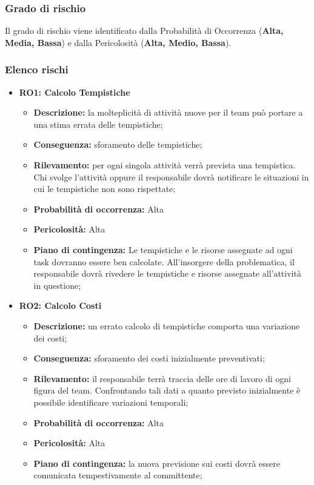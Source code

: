 \subsubsection{Grado di rischio}
Il grado di rischio viene identificato dalla Probabilità di Occorrenza (\textbf{Alta, Media, Bassa}) e dalla Pericolosità (\textbf{Alta, Medio, Bassa}).
\subsubsection{Elenco rischi}

\begin{itemize}
	\item \textbf{RO1: Calcolo Tempistiche}
	\begin{itemize}
		\item \textbf{Descrizione:} la molteplicità di attività nuove per il team può portare a una stima errata delle tempistiche;
		\item \textbf{Conseguenza:} sforamento delle tempistiche;
		\item \textbf{Rilevamento:} per ogni singola attività verrà prevista una tempistica. Chi svolge l'attività oppure il responsabile dovrà notificare le situazioni in cui le tempistiche non sono rispettate;
		\item \textbf{Probabilità di occorrenza:} Alta
		\item \textbf{Pericolosità:} Alta
		\item \textbf{Piano di contingenza:} Le tempistiche e le risorse assegnate ad ogni task dovranno essere ben calcolate. All'insorgere della problematica, il responsabile dovrà rivedere le tempistiche e risorse assegnate all'attività in questione;
	\end{itemize}
	
	\item \textbf{RO2: Calcolo Costi}
	\begin{itemize}
		\item \textbf{Descrizione:} un errato calcolo di tempistiche comporta una variazione dei costi;
		\item \textbf{Conseguenza:} sforamento dei costi inizialmente preventivati;
		\item \textbf{Rilevamento:} il responsabile terrà traccia delle ore di lavoro di ogni figura del team. Confrontando tali dati a quanto previsto inizialmente è possibile identificare variazioni temporali;
		\item \textbf{Probabilità di occorrenza:} Alta
		\item \textbf{Pericolosità:} Alta
		\item \textbf{Piano di contingenza:} la nuova previsione sui costi dovrà essere comunicata tempestivamente al committente;
	\end{itemize}
	

\end{itemize}
